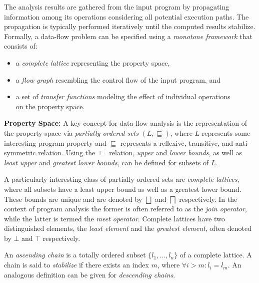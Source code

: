 The analysis results are gathered from the input program by propagating
information among its operations considering all potential execution paths. The
propagation is typically 
performed iteratively until the computed results
stabilize. Formally, a data-flow problem can be specified using a \emph{monotone
framework} that consists of:
\begin{itemize}
  \item a \emph{complete lattice} representing the property space,
  \item a \emph{flow graph} resembling the control flow of the input program, 
        and
  \item a set of \emph{transfer functions} modeling the effect of individual
        operations \\ on the property space.
\end{itemize}

\textbf{Property Space:}
A key concept for data-flow analysis is the representation of the property space
via \emph{partially ordered sets} $(L, \sqsubseteq)$, where $L$ represents some
interesting program property and $\sqsubseteq$ represents a reflexive, transitive, and
anti-symmetric relation. Using the $\sqsubseteq$ relation, \emph{upper} and
\emph{lower bounds}, as well as \emph{least upper} and \emph{greatest lower
bounds}, can be defined for subsets of $L$.

A particularly interesting class of partially ordered sets are \emph{complete
lattices}, where all subsets have a least upper bound 
as well as a greatest
lower bound. These bounds are unique and are denoted by $\bigsqcup$ and
$\bigsqcap$ respectively. In the context of program analysis the former is often
referred to as the \emph{join operator}, while the latter is termed the
\emph{meet operator}. Complete lattices have two distinguished elements, the
\emph{least element} and the \emph{greatest element}, often denoted by 
$\bot$ and $\top$
respectively.

An \emph{ascending chain} is a totally 
ordered subset $\{l_1, \ldots, l_n \}$ of
a complete lattice. A chain is said to \emph{stabilize} if there exists an index
$m$, where $\forall i > m \colon l_i = l_m$. An analogous definition can be
given for \emph{descending chains}.

